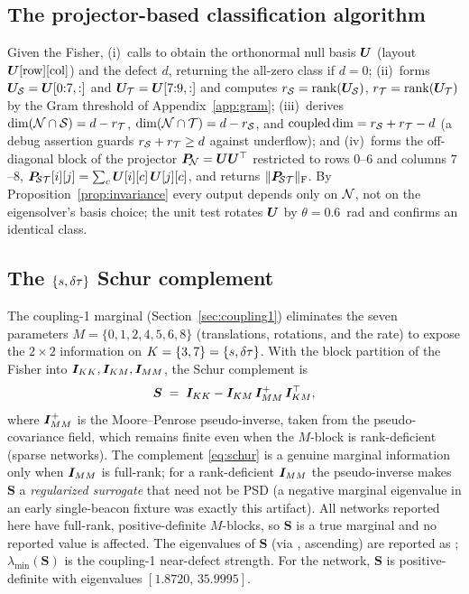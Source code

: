 \subsection{The projector-based classification algorithm}
\label{app:classify}

Given the Fisher,  (i)~calls  to obtain the
orthonormal null basis $\bm{U}$ (layout $\bm{U}[\text{row}][\text{col}]$) and the defect $d$,
returning the all-zero class if $d=0$; (ii)~forms $\bm{U}_{\mathcal{S}}=\bm{U}[0{:}7,:]$ and
$\bm{U}_{\mathcal{T}}=\bm{U}[7{:}9,:]$ and computes $r_{\mathcal{S}}=\operatorname{rank}(\bm{U}_{\mathcal{S}})$,
$r_{\mathcal{T}}=\operatorname{rank}(\bm{U}_{\mathcal{T}})$ by the Gram threshold of Appendix~\ref{app:gram};
(iii)~derives $\dim(\mathcal{N}\cap\mathcal{S})=d-r_{\mathcal{T}}$, $\dim(\mathcal{N}\cap\mathcal{T})=d-r_{\mathcal{S}}$, and
$\operatorname{coupled\,dim}=r_{\mathcal{S}}+r_{\mathcal{T}}-d$ (a debug assertion guards
$r_{\mathcal{S}}+r_{\mathcal{T}}\ge d$ against underflow); and (iv)~forms the off-diagonal block of the
projector $\bm{P}_{\!\mathcal{N}}=\bm{U}\bm{U}^\top$ restricted to rows $0$--$6$ and columns $7$--$8$,
$\bm{P}_{\!\mathcal{S}\mathcal{T}}[i][j]=\sum_{c}\bm{U}[i][c]\,\bm{U}[j][c]$, and returns
$\lVert\bm{P}_{\!\mathcal{S}\mathcal{T}}\rVert_{\mathrm F}$. By Proposition~\ref{prop:invariance} every output depends only
on $\mathcal{N}$, not on the eigensolver's basis choice; the unit test
 rotates $\bm{U}$ by
$\theta=0.6$~rad and confirms an identical class.

\subsection{The \texorpdfstring{$\{s,\delta\tau\}$}{\{s,dtau\}} Schur complement}
\label{app:schur}

The coupling-1 marginal (Section~\ref{sec:coupling1}) eliminates the seven parameters
$M=\{0,1,2,4,5,6,8\}$ (translations, rotations, and the rate) to expose the $2\times2$
information on $K=\{3,7\}=\{s,\delta\tau\}$. With the block partition of the Fisher into
$\bm{I}_{KK},\bm{I}_{KM},\bm{I}_{MM}$, the Schur complement is
\begin{equation}
  \bm S \;=\; \bm{I}_{KK}-\bm{I}_{KM}\,\bm{I}_{MM}^{+}\,\bm{I}_{KM}^\top,
  \label{eq:schur}
\end{equation}
where $\bm{I}_{MM}^{+}$ is the Moore--Penrose pseudo-inverse, taken from the
 pseudo-covariance field, which remains finite even when the
$M$-block is rank-deficient (sparse networks). The complement \eqref{eq:schur} is a genuine
marginal information only when $\bm{I}_{MM}$ is full-rank; for a rank-deficient $\bm{I}_{MM}$
the pseudo-inverse makes $\bm S$ a \emph{regularized surrogate} that need not be PSD (a
negative marginal eigenvalue in an early single-beacon fixture was exactly this artifact).
All networks reported here have full-rank, positive-definite $M$-blocks, so $\bm S$ is a true
marginal and no reported value is affected. The eigenvalues of $\bm S$ (via
, ascending) are reported as ; $\lambda_{\min}(\bm S)$
is the coupling-1 near-defect strength. For the  network,
$\bm S$ is positive-definite with eigenvalues $[1.8720,\,35.9995]$.

